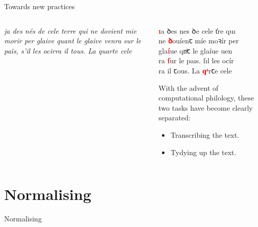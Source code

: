 \documentclass[aspectratio=169]{beamer}
\newcommand{\juni}[1]{{\junicodeFont #1}}
\newcommand{\red}[1]{\textcolor{red}{\bf #1}}
\begin{document}
\begin{frame}{Towards new practices}
\begin{columns}[t]
\begin{column}{.52\textwidth}
                    \vspace{-1em}
                    \textit{ja des nés de cele terre qui ne dovient mie morir per glaive quant le glaive venra sur le païs, s'il les ocirra il tous. La quarte cele}
            \end{column}
            \begin{column}{.48\textwidth}
                \begin{minipage}[t][.48\textheight]{\textwidth}
                    \vspace{.2cm}
                    \juni{\red{ı}a \juni{ꝺ}es nes \juni{ꝺ}e cele \juni{t̾}re quı\\ 
                    ne \red{\juni{ꝺ}}ouíen\juni{ꞇ} míe mo\juni{ꝛ}ír per\\ 
                    gla\red{í}ue q\juni{nͣ}\juni{ꞇ} le glaíue uen\\ 
                    ra \red{\juni{ſ}}ur le paıs. \juni{ſ}ıl les ocír\\ 
                    ra il \juni{ꞇ}ous. La \red{\juni{qͣ}}r\juni{ꞇ}e cele}
                \end{minipage}\par
                \begin{minipage}[t][.48\textheight]{\textwidth}
                    With the advent of computational philology, these two tasks have become clearly separated:
                    \begin{itemize}
                        \item Transcribing the text.
                        \item Tydying up the text.
                    \end{itemize}               
                \end{minipage}
            \end{column}
        \end{columns}
    \end{frame}


    \section{Normalising}

    \begin{frame}
	\begin{center}
	    Normalising
	\end{center}
    \end{frame}
\end{document}
